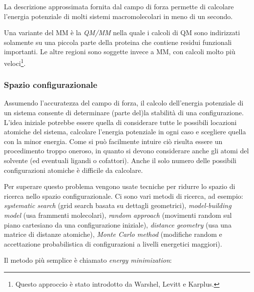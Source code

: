 {{\par La descrizione approssimata fornita dal campo di forza permette di calcolare l'energia potenziale di molti sistemi macromolecolari in meno di un secondo. \\

\par Una variante del MM è la \textit{QM/MM} nella quale i calcoli di QM sono indirizzati solamente su una piccola parte della proteina che contiene residui funzionali importanti. Le altre regioni sono soggette invece a MM, con calcoli molto più veloci\footnote{Questo approccio è stato introdotto da Warshel, Levitt e Karplus.}.

\subsubsection{Spazio configurazionale}

\par Assumendo l'accuratezza del campo di forza, il calcolo dell'energia potenziale di un sistema consente di determinare (parte del)la stabilità di una configurazione. L'idea iniziale potrebbe essere quella di considerare tutte le possibili locazioni atomiche del sistema, calcolare l'energia potenziale in ogni caso e scegliere quella con la minor energia. Come si può facilmente intuire ciò risulta essere un procedimento troppo oneroso, in quanto si devono considerare anche gli atomi del solvente (ed eventuali ligandi o cofattori). Anche il solo numero delle possibili configurazioni atomiche è difficile da calcolare.

\par Per superare questo problema vengono usate tecniche per ridurre lo spazio di ricerca nello spazio configurazionale. Ci sono vari metodi di ricerca, ad esempio: \textit{systematic search }(grid search basata su dettagli geometrici), \textit{model-building model }(usa frammenti molecolari), \textit{random approach }(movimenti random sul piano cartesiano da una configurazione iniziale), \textit{distance geometry} (usa una matrice di distanze atomiche), \textit{Monte Carlo method} (modifiche random e accettazione probabilistica di configurazioni a livelli energetici maggiori)\supercite{ROY2015151}.

\par Il metodo più semplice è chiamato \textit{energy minimization}:

}}
